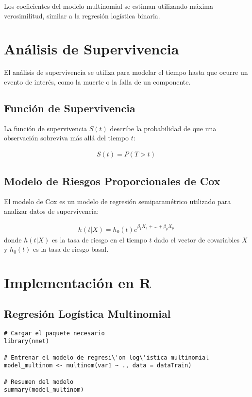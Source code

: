 \documentclass[a4paper]{report} %
\begin{document}
Los coeficientes del modelo multinomial se estiman utilizando m\'axima verosimilitud, similar a la regresi\'on log\'istica binaria.

\section{An\'alisis de Supervivencia}

El an\'alisis de supervivencia se utiliza para modelar el tiempo hasta que ocurre un evento de inter\'es, como la muerte o la falla de un componente.

\subsection{Funci\'on de Supervivencia}

La funci\'on de supervivencia $S(t)$ describe la probabilidad de que una observaci\'on sobreviva m\'as all\'a del tiempo $t$:

\begin{eqnarray*}
S(t) = P(T > t)
\end{eqnarray*}

\subsection{Modelo de Riesgos Proporcionales de Cox}

El modelo de Cox es un modelo de regresi\'on semiparam\'etrico utilizado para analizar datos de supervivencia:

\begin{eqnarray*}
h(t|X) = h_0(t) e^{\beta_1 X_1 + \ldots + \beta_p X_p}
\end{eqnarray*}
donde $h(t|X)$ es la tasa de riesgo en el tiempo $t$ dado el vector de covariables $X$ y $h_0(t)$ es la tasa de riesgo basal.

\section{Implementaci\'on en R}

\subsection{Regresi\'on Log\'istica Multinomial}

\begin{verbatim}
# Cargar el paquete necesario
library(nnet)

# Entrenar el modelo de regresi\'on log\'istica multinomial
model_multinom <- multinom(var1 ~ ., data = dataTrain)

# Resumen del modelo
summary(model_multinom)
\end{verbatim}
\end{document}

